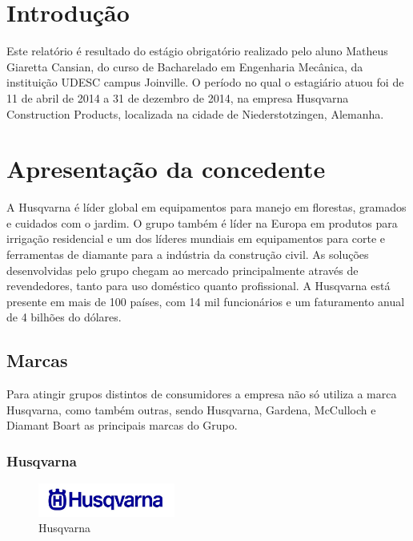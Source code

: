 \documentclass[12pt]{article}
\begin{document}
\setcounter{page}{13}

\section{Introdução}

	Este relatório é resultado do estágio obrigatório realizado pelo aluno Matheus Giaretta Cansian, do curso de Bacharelado em Engenharia Mecânica, da instituição UDESC campus Joinville.
	O período no qual o estagiário atuou foi de 11 de abril de 2014 a 31 de dezembro de 2014, na empresa Husqvarna Construction Products, localizada na cidade de Niederstotzingen, Alemanha.
\pagebreak

\section{Apresentação da concedente}

	A Husqvarna é líder global em equipamentos para manejo em florestas, gramados e cuidados com o jardim. O grupo também é líder na Europa em produtos para irrigação residencial e um dos líderes mundiais em equipamentos para corte e ferramentas de diamante para a indústria da construção civil. As soluções desenvolvidas pelo grupo chegam ao mercado principalmente através de revendedores, tanto para uso doméstico quanto profissional. A Husqvarna está presente em mais de 100 países, com 14 mil funcionários e um faturamento anual de 4 bilhões do dólares.

\subsection{Marcas}

	Para atingir grupos distintos de consumidores a empresa não só utiliza a marca Husqvarna, como também outras, sendo Husqvarna, Gardena, McCulloch e Diamant Boart as principais marcas do Grupo.

\subsubsection{Husqvarna}

\begin{figure}[h!]
	\centering
	\includegraphics[width=0.4\textwidth]{img/logo-husqvarna.png}
	\caption{Husqvarna}
\end{figure}
\end{document}
